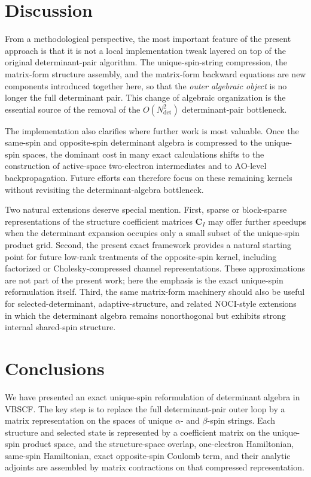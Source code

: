 \documentclass[journal=jctcce,manuscript=article]{achemso}
\newcommand{\ndet}{N_{\mathrm{det}}}
\newcommand{\Cmat}{\mathbf{C}}
\begin{document}
\section{Discussion}
From a methodological perspective, the most important feature of the present
approach is that it is not a local implementation tweak layered on top of the
original determinant-pair algorithm. The unique-spin-string compression, the
matrix-form structure assembly, and the matrix-form backward equations are new
components introduced together here, so that the \emph{outer algebraic object}
is no longer the full determinant pair. This change of algebraic organization
is the essential source of the removal of the $O(\ndet^2)$
determinant-pair bottleneck.

The implementation also clarifies where further work is most valuable. Once the
same-spin and opposite-spin determinant algebra is compressed to the unique-spin
spaces, the dominant cost in many exact calculations shifts to the construction
of active-space two-electron intermediates and to AO-level backpropagation.
Future efforts can therefore focus on these remaining kernels without
revisiting the determinant-algebra bottleneck.

Two natural extensions deserve special mention. First, sparse or block-sparse
representations of the structure coefficient matrices $\Cmat_I$ may offer
further speedups when the determinant expansion occupies only a small subset of
the unique-spin product grid. Second, the present exact framework provides a
natural starting point for future low-rank treatments of the opposite-spin
kernel, including factorized or Cholesky-compressed channel representations. These
approximations are not part of the present work; here the emphasis is the exact
unique-spin reformulation itself. Third, the same matrix-form machinery should
also be useful for selected-determinant, adaptive-structure, and related
NOCI-style extensions in which the determinant algebra remains nonorthogonal
but exhibits strong internal shared-spin structure.

\section{Conclusions}
We have presented an exact unique-spin reformulation of determinant algebra in
VBSCF. The key step is to replace the full determinant-pair outer loop by a
matrix representation on the spaces of unique $\alpha$- and $\beta$-spin
strings. Each structure and selected state is represented by a coefficient
matrix on the unique-spin product space, and the structure-space overlap,
one-electron Hamiltonian, same-spin Hamiltonian, exact opposite-spin Coulomb
term, and their analytic adjoints are assembled by matrix contractions on that
compressed representation.
\end{document}
